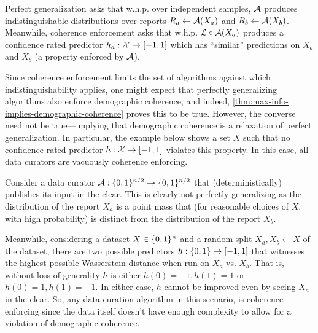 Perfect generalization asks that w.h.p. over independent samples, $\mathcal{A}$ produces indistinguishable distributions over reports $R_a \leftarrow \mathcal{A}(X_a)$ and $R_b \leftarrow \mathcal{A}(X_b)$. Meanwhile, coherence enforcement asks that w.h.p. $\mathcal{L}\circ\mathcal{A}(X_a)$ produces a confidence rated predictor $h_a:\mathcal{X} \to [-1,1]$ which has ``similar'' predictions on $X_a$ and $X_b$ (a property enforced by $\mathcal{A}$).  

Since coherence enforcement limits the set of algorithms against which indistinguishability applies, one might expect that perfectly generalizing algorithms also enforce demographic coherence, and indeed, \cref{thm:max-info-implies-demographic-coherence} proves this to be true. However, the converse need not be true---implying that demographic coherence is a relaxation of perfect generalization. 
In particular, the example below shows a set $X$ such that no confidence rated predictor $h:\mathcal{X} \to [-1,1]$ violates this property. In this case, all data curators are vacuously coherence enforcing.
 
Consider a data curator $\mathcal{A}:\{0,1\}^{n/2}\to\{0,1\}^{n/2}$ that (deterministically) publishes its input in the clear. This is clearly not perfectly generalizing as the distribution of the report $X_a$ is a point mass that (for reasonable choices of $X$, with high probability) is distinct from the distribution of the report $X_b$.

Meanwhile, considering a dataset $X\in\{0,1\}^n$ and a random split $X_a,X_b \leftarrow X$ of the dataset, there are two possible predictors $h:\{0,1\} \to [-1,1]$ that witnesses the highest possible Wasserstein distance when run on $X_a$ vs. $X_b$. That is, without loss of generality $h$ is either $h(0)=-1, h(1) = 1$ or $h(0) = 1, h(1) = -1$. In either case, $h$ cannot be improved even by seeing $X_a$ in the clear. So, any data curation algorithm in this scenario, is coherence enforcing since the data itself doesn't have enough complexity to allow for a violation of demographic coherence. 


